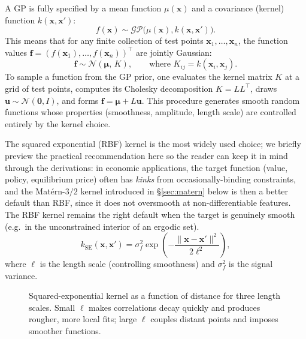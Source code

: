 \documentclass[11pt,a4paper]{report}
\newcommand{\x}{\bm{x}}
\begin{document}
A GP is fully specified by a mean function $\mu(\x)$ and a covariance (kernel) function $k(\x, \x')$:
\begin{equation}
f(\x) \sim \mathcal{GP}\bigl(\mu(\x), k(\x, \x')\bigr).
\end{equation}
This means that for any finite collection of test points $\x_1, \ldots, \x_n$, the function values $\bm{f} = (f(\x_1), \ldots, f(\x_n))^\top$ are jointly Gaussian:
\begin{equation}
\bm{f} \sim \mathcal{N}(\bm{\mu},\, K), \qquad \text{where } K_{ij} = k(\x_i, \x_j).
\end{equation}
To sample a function from the GP prior, one evaluates the kernel matrix $K$ at a grid of test points, computes its Cholesky decomposition $K = LL^\top$, draws $\bm{u} \sim \mathcal{N}(\bm{0}, I)$, and forms $\bm{f} = \bm{\mu} + L\bm{u}$.  This procedure generates smooth random functions whose properties (smoothness, amplitude, length scale) are controlled entirely by the kernel choice.

The squared exponential (RBF) kernel is the most widely used choice; we briefly preview the practical recommendation here so the reader can keep it in mind through the derivations: in economic applications, the target function (value, policy, equilibrium price) often has \emph{kinks} from occasionally-binding constraints, and the Mat\'ern-$3/2$ kernel introduced in \S\ref{sec:matern} below is then a better default than RBF, since it does not oversmooth at non-differentiable features.  The RBF kernel remains the right default when the target is genuinely smooth (e.g.\ in the unconstrained interior of an ergodic set).
\begin{equation}
k_\mathrm{SE}(\x, \x') = \sigma_f^2 \exp\!\left(-\frac{\|\x - \x'\|^2}{2\ell^2}\right),
\end{equation}
where $\ell$ is the length scale (controlling smoothness) and $\sigma_f^2$ is the signal variance.

\begin{figure}[ht]
\centering
{}
\caption{Squared-exponential kernel as a function of distance for three length scales.  Small $\ell$ makes correlations decay quickly and produces rougher, more local fits; large $\ell$ couples distant points and imposes smoother functions.}
\label{fig:rbf_length_scale}
\end{figure}
\end{document}
